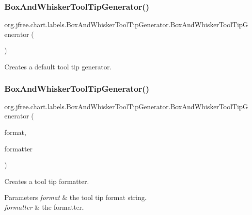 \subsubsection{\texorpdfstring{Box\+And\+Whisker\+Tool\+Tip\+Generator()}{BoxAndWhiskerToolTipGenerator()}\hspace{0.1cm}{\footnotesize\ttfamily [1/2]}}
{\footnotesize\ttfamily org.\+jfree.\+chart.\+labels.\+Box\+And\+Whisker\+Tool\+Tip\+Generator.\+Box\+And\+Whisker\+Tool\+Tip\+Generator (\begin{DoxyParamCaption}{ }\end{DoxyParamCaption})}

Creates a default tool tip generator. \mbox{\label{classorg_1_1jfree_1_1chart_1_1labels_1_1_box_and_whisker_tool_tip_generator_a02412e80309218c88a88aa2b0977dbe8}} 
\subsubsection{\texorpdfstring{Box\+And\+Whisker\+Tool\+Tip\+Generator()}{BoxAndWhiskerToolTipGenerator()}\hspace{0.1cm}{\footnotesize\ttfamily [2/2]}}
{\footnotesize\ttfamily org.\+jfree.\+chart.\+labels.\+Box\+And\+Whisker\+Tool\+Tip\+Generator.\+Box\+And\+Whisker\+Tool\+Tip\+Generator (\begin{DoxyParamCaption}\item[{String}]{format,  }\item[{Number\+Format}]{formatter }\end{DoxyParamCaption})}

Creates a tool tip formatter.


\begin{DoxyParams}{Parameters}
{\em format} & the tool tip format string. \\
\hline
{\em formatter} & the formatter. \\
\hline
\end{DoxyParams}


